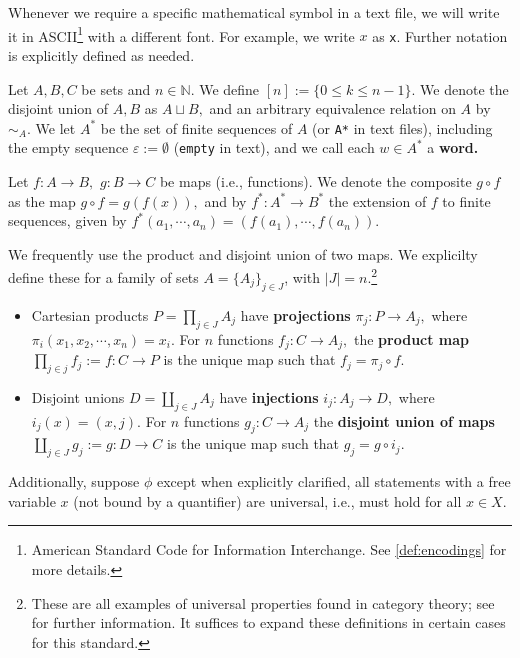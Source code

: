 Whenever we require a specific mathematical symbol in a text file, we will write it in ASCII\footnote{American Standard Code for Information Interchange. See \ref{def:encodings} for more details.} with a different font. For example, we write $x$ as \texttt{x}. Further notation is explicitly defined as needed.

Let $A, B, C$ be sets and $n \in \mathbb{N}$. We define $[n] := \{0 \leq k \leq n-1\}.$  We denote the disjoint union of $A, B$ as $A \sqcup B,$ and an arbitrary equivalence relation on $A$ by $\sim_{A}.$ We let $A^{*}$ be the set of finite sequences of $A$ (or \texttt{A*} in text files), including the empty sequence $\varepsilon := \emptyset$ (\texttt{empty} in text), and we call each $w \in A^{*}$ a \textbf{word.}

Let $f: A \to B,$ $g: B \to C$ be maps (i.e., functions). We denote the composite $g \circ f$ as the map $g \circ f = g(f(x)),$ and by $f^{*}: A^{*} \to B^{*}$ the extension of $f$ to finite sequences, given by $f^{*}(a_{1}, \cdots, a_{n}) = (f(a_{1}), \cdots, f(a_{n})).$

We frequently use the product and disjoint union of two maps. We explicilty define these for a family of sets $A = \{A_j\}_{j \in J}$, with $|J| = n.$\footnote{These are all examples of universal properties found in category theory; see \cite{maclane} for further information. It suffices to expand these definitions in certain cases for this standard.}
\begin{itemize}
\item Cartesian products $P = \prod_{j \in J}A_{j}$ have \textbf{projections} $\pi_j: P \to A_{j},$ where $\pi_i(x_{1}, x_{2}, \cdots, x_{n}) = x_{i}.$ For $n$ functions $f_{j}: C \to A_{j},$ the \textbf{product map} $\prod_{j \in j}f_{j} := f: C \to P$ is the unique map such that $f_{j} = \pi_{j} \circ f.$
  \item Disjoint unions $D = \coprod_{j \in J}A_{j}$ have \textbf{injections} $i_{j}: A_{j} \to D,$ where $i_{j}(x) = (x, j).$ For $n$ functions $g_j: C \to A_{j}$ the \textbf{disjoint union of maps} $\coprod_{j \in J}g_{j} := g: D \to C$ is the unique map such that
$g_{j} = g \circ i_{j}.$
\end{itemize}

Additionally, suppose $\phi$ except when explicitly clarified, all statements with a free variable $x$ (not bound by a quantifier) are universal, i.e., must hold for all $x \in X.$

